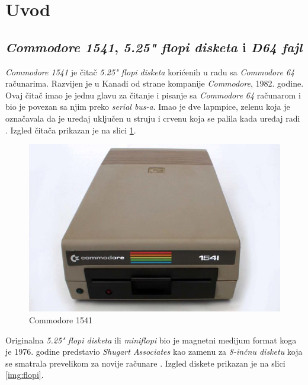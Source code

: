 \section{Uvod}

\subsection{\textit{Commodore 1541}, \textit{5.25" flopi disketa} i \textit{D64 fajl}}
\textit{Commodore 1541} je čitač \textit{5.25" flopi disketa} korićenih u radu sa \textit{Commodore 64} računarima. Razvijen je u Kanadi od strane kompanije \textit{Commodore}, 1982. godine. Ovaj čitač imao je jednu glavu za čitanje i pisanje sa \textit{Commodore 64} računarom i bio je povezan sa njim preko \textit{serial bus-a}. Imao je dve lapmpice, zelenu koja je označavala da je uređaj uključen u struju i crvenu koja se palila kada uređaj radi \cite{Commodore1541Text}. Izgled čitača prikazan je na slici \ref{img:commodore1541}.
\begin{figure}[ht]
\begin{center}
\includegraphics[width=\textwidth]{img/Commodore1541.jpg}
\caption[Commodore 1541 \textit{(preuzeto \cite{Commodore1541})}]{Commodore 1541}
\label{img:commodore1541}
\end{center}
\end{figure}

Originalna \textit{5.25" flopi disketa} ili \textit{miniflopi} bio je magnetni medijum format koga je 1976. godine predstavio \textit{Shugart Associates} kao zamenu za \textit{8-inčnu disketu} koja se smatrala prevelikom za novije računare \cite{5.25Flopi}. Izgled diskete prikazan je na slici \ref{img:flopi}.

